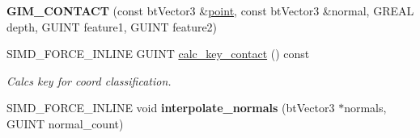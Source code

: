 \begin{DoxyCompactItemize}
\item 
\hypertarget{class_g_i_m___c_o_n_t_a_c_t_ac27e6b6f50d458d5400fe135d85401bb}{{\bfseries G\+I\+M\+\_\+\+C\+O\+N\+T\+A\+C\+T} (const bt\+Vector3 \&\hyperlink{structpoint}{point}, const bt\+Vector3 \&normal, G\+R\+E\+A\+L depth, G\+U\+I\+N\+T feature1, G\+U\+I\+N\+T feature2)}\label{class_g_i_m___c_o_n_t_a_c_t_ac27e6b6f50d458d5400fe135d85401bb}

\item 
\hypertarget{class_g_i_m___c_o_n_t_a_c_t_ad8110f809b61009ed8424e25f7ae9f78}{S\+I\+M\+D\+\_\+\+F\+O\+R\+C\+E\+\_\+\+I\+N\+L\+I\+N\+E G\+U\+I\+N\+T \hyperlink{class_g_i_m___c_o_n_t_a_c_t_ad8110f809b61009ed8424e25f7ae9f78}{calc\+\_\+key\+\_\+contact} () const }\label{class_g_i_m___c_o_n_t_a_c_t_ad8110f809b61009ed8424e25f7ae9f78}

\begin{DoxyCompactList}\small\item\em Calcs key for coord classification. \end{DoxyCompactList}\item 
\hypertarget{class_g_i_m___c_o_n_t_a_c_t_a3f2d3d46cf49b6d1ff3f2c8299a2c3ca}{S\+I\+M\+D\+\_\+\+F\+O\+R\+C\+E\+\_\+\+I\+N\+L\+I\+N\+E void {\bfseries interpolate\+\_\+normals} (bt\+Vector3 $\ast$normals, G\+U\+I\+N\+T normal\+\_\+count)}\label{class_g_i_m___c_o_n_t_a_c_t_a3f2d3d46cf49b6d1ff3f2c8299a2c3ca}

\end{DoxyCompactItemize}
